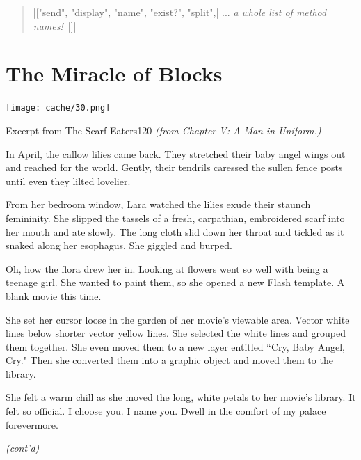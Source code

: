 \documentclass[12pt,twoside]{report}
\begin{document}
\begin{quote}
\rubyinline|["send", "display", "name", "exist?", "split",|
 ... {\em a whole list of method names!}~\rubyinline|]|\end{quote}



\section{The Miracle of Blocks}


	\texttt{[image: cache/30.png]}

	\begin{sidebar}{Excerpt from The Scarf Eaters}{120}
		\textit{(from Chapter V: A Man in Uniform.)}\vspace{6pt}
		
		In April, the callow lilies came back. They stretched their baby angel wings out and reached for the world. Gently, their tendrils caressed the sullen fence posts until even they lilted lovelier.\vspace{6pt}

		From her bedroom window, Lara watched the lilies exude their staunch femininity. She slipped the tassels of a fresh, carpathian, embroidered scarf into her mouth and ate slowly. The long cloth slid down her throat and tickled as it snaked along her esophagus. She giggled and burped.\vspace{6pt}

		Oh, how the flora drew her in. Looking at flowers went so well with being a teenage girl. She wanted to paint them, so she opened a new Flash template. A blank movie this time. \vspace{6pt}
		
		She set her cursor loose in the garden of her movie's viewable area. Vector white lines below shorter vector yellow lines. She selected the white lines and grouped them together. She even moved them to a new layer entitled ``Cry, Baby Angel, Cry." Then she converted them into a graphic object and moved them to the library.\vspace{6pt}
		
		She felt a warm chill as she moved the long, white petals to her movie's library. It felt so official. I choose you. I name you. Dwell in the comfort of my palace forevermore.\vspace{6pt}

		\textit{(cont'd)}\vspace{6pt}
	\end{sidebar}
\end{document}
